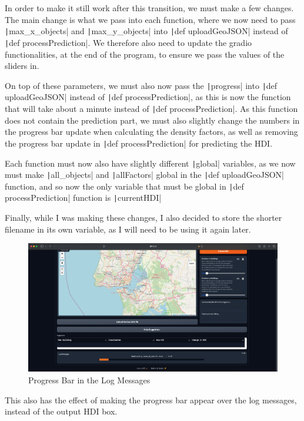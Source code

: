 \documentclass[12pt]{report}
\newcommand{\pil}[1]{\protect\texttt|#1|}
\begin{document}
In order to make it still work after this transition, we must make a few changes. The main change is what we pass into each function, where we now need to pass \pil{max_x_objects} and \pil{max_y_objects} into \pil{def uploadGeoJSON} instead of \pil{def processPrediction}. We therefore also need to update the gradio functionalities, at the end of the program, to ensure we pass the values of the sliders in.

On top of these parameters, we must also now pass the \pil{progress} into \pil{def uploadGeoJSON} instead of \pil{def processPrediction}, as this is now the function that will take about a minute instead of \pil{def processPrediction}. As this function does not contain the prediction part, we must also slightly change the numbers in the progress bar update when calculating the density factors, as well as removing the progress bar update in \pil{def processPrediction} for predicting the HDI.

Each function must now also have slightly different \pil{global} variables, as we now must make \pil{all_objects} and \pil{allFactors} global in the \pil{def uploadGeoJSON} function, and so now the only variable that must be global in \pil{def processPrediction} function is \pil{currentHDI}

Finally, while I was making these changes, I also decided to store the shorter filename in its own variable, as I will need to be using it again later.

\begin{figure}[H]
\centering
\includegraphics[width=14cm]{ss20.2.png}
\caption{Progress Bar in the Log Messages}\label{fig:ss20.2}
\end{figure}

This also has the effect of making the progress bar appear over the log messages, instead of the output HDI box.
\end{document}
